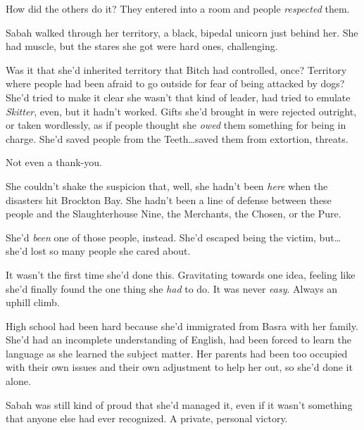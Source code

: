 





How did the others do it?  They entered into a room and people \emph{respected} them.



Sabah walked through her territory, a black, bipedal unicorn just behind her.  She had muscle, but the stares she got were hard ones, challenging.



Was it that she'd inherited territory that Bitch had controlled, once?  Territory where people had been afraid to go outside for fear of being attacked by dogs?  She'd tried to make it clear she wasn't that kind of leader, had tried to emulate \emph{Skitter}, even, but it hadn't worked.  Gifts she'd brought in were rejected outright, or taken wordlessly, as if people thought she \emph{owed} them something for being in charge.  She'd saved people from the Teeth\ldots saved them from extortion, threats.



Not even a thank-you.



She couldn't shake the suspicion that, well, she hadn't been \emph{here} when the disasters hit Brockton Bay.  She hadn't been a line of defense between these people and the Slaughterhouse Nine, the Merchants, the Chosen, or the Pure.



She'd \emph{been} one of those people, instead.  She'd escaped being the victim, but\ldots she'd lost so many people she cared about.



It wasn't the first time she'd done this.  Gravitating towards one idea, feeling like she'd finally found the one thing she \emph{had} to do.  It was never \emph{easy}.  Always an uphill climb.



High school had been hard because she'd immigrated from Basra with her family.  She'd had an incomplete understanding of English, had been forced to learn the language as she learned the subject matter.  Her parents had been too occupied with their own issues and their own adjustment to help her out, so she'd done it alone.



Sabah was still kind of proud that she'd managed it, even if it wasn't something that anyone else had ever recognized.  A private, personal victory.



